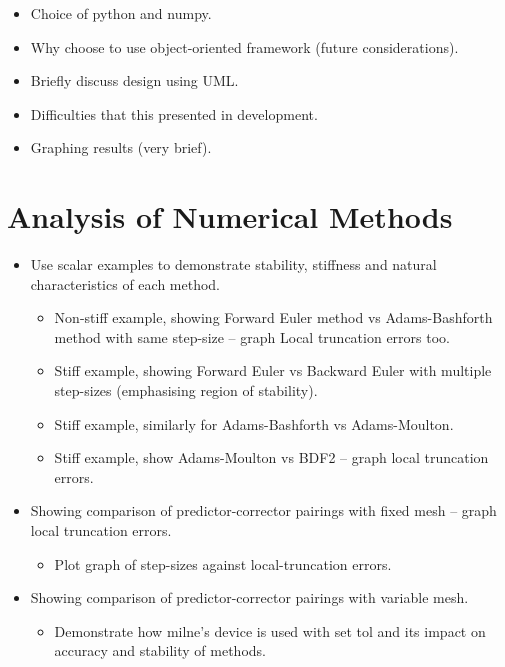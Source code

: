 \documentclass[11pt,a4paper]{article}
\begin{document}
\begin{itemize}
  \item{Choice of python and numpy.}
  \item{Why choose to use object-oriented framework (future considerations).}
  \item{Briefly discuss design using UML.}
  \item{Difficulties that this presented in development.}
  \item{Graphing results (very brief).}
\end{itemize}

\section{Analysis of Numerical Methods}

\begin{itemize}
  \item Use scalar examples to demonstrate stability, stiffness and natural characteristics of each method.
     \begin{itemize}[label=$\star$]
        \item Non-stiff example, showing Forward Euler method vs Adams-Bashforth method with same step-size – graph Local truncation errors too.
        \item Stiff example, showing Forward Euler vs Backward Euler with multiple step-sizes (emphasising region of stability).
        \item Stiff example, similarly for Adams-Bashforth vs Adams-Moulton.
        \item Stiff example, show Adams-Moulton vs BDF2 – graph local truncation errors.
     \end{itemize}
  \item Showing comparison of predictor-corrector pairings with fixed mesh – graph local truncation errors.
    \begin{itemize}[label=$\star$]
      \item Plot graph of step-sizes against local-truncation errors.
    \end{itemize}
  \item Showing comparison of predictor-corrector pairings with variable mesh.
    \begin{itemize}[label=$\star$]
      \item Demonstrate how milne’s device is used with set tol and its impact on accuracy and stability of methods.
    \end{itemize}
\end{itemize}
\end{document}
